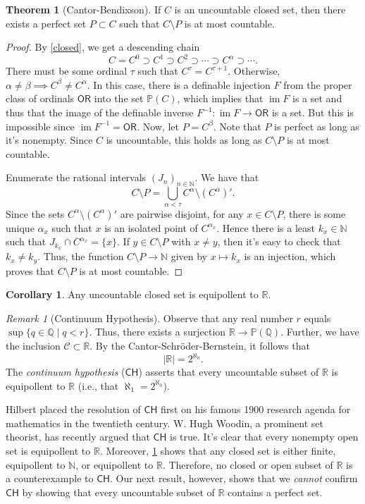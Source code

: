 \documentclass[10pt,letterpaper,cm]{nupset}
\theoremstyle{definition}
\theoremstyle{theorem}
\newtheorem{theorem}[definition]{Theorem}
\newtheorem{corollary}[definition]{Corollary}
\theoremstyle{remark}
\newtheorem{remark}[definition]{Remark}
\newcommand{\N}{\mathbb N}
\renewcommand{\P}{\mathbb P}
\newcommand{\Q}{\mathbb Q}
\newcommand{\R}{\mathbb R}
\newcommand{\1}{\mathbf{1}}
\newcommand{\0}{\vec 0}
\newcommand{\ord}{\mathsf{OR}}
\DeclareMathOperator{\im}{im}
\begin{document}
\begin{theorem}[Cantor-Bendixson]
If $C$ is an uncountable closed set, then there exists a perfect set $P\subset C$ such that $C \setminus P$ is at most countable.
\end{theorem}
\begin{proof}
By \cref{closed}, we get a descending chain $$ C = C^0 \supset C^1 \supset C^2 \supset \cdots \supset C^{\alpha} \supset \cdots.    $$ There must be some ordinal $\tau$ such that $C^{\tau} = C^{\tau +1}$. Otherwise, $\alpha \ne \beta \implies C^{\beta} \ne C^{\alpha}$. In this case, there is a definable injection $F$ from the proper class of ordinals $\ord$ into the set $\P(C)$, which implies that $\im{F}$ is a set and thus that the image of the definable inverse $F^{-1} : \im{F} \to \ord$ is a set. But this is impossible since $\im{F^{-1}} = \ord$. Now, let $P = C^{\beta}$. Note that $P$ is perfect as long as it's nonempty. Since $C$ is uncountable, this holds as long as  $C \setminus P$ is at most countable.

\smallskip
 Enumerate the rational intervals $\left(J_n\right)_{n\in \N}$. We have that $$ C\setminus P = {\bigcup_{\alpha < \tau} C^{\alpha} \setminus \left(C^{\alpha}\right)'}.    $$ Since the sets $C^{\alpha} \setminus \left(C^{\alpha}\right)'$ are pairwise disjoint, for any $x\in C\setminus P$, there is some unique $\alpha_x$ such that $x$ is an isolated point of $C^{\alpha_x}$. Hence there is a least $k_x \in \N$ such that $J_{k_x} \cap C^{\alpha_x} = \{x\}$. If $y \in C \setminus P$ with $x\ne y$, then it's easy to check that $k_x \ne k_y$. Thus, the function $C\setminus P \to \N$ given by $x \mapsto k_x$ is an injection, which proves that $C\setminus P$ is at most countable. 
\end{proof}

\begin{corollary}\label{LC'}
Any uncountable closed set is equipollent to $\R$.
\end{corollary}

\begin{remark}[Continuum Hypothesis] 
Observe that any real number $r$ equals $\sup\{q\in \Q \mid q<r\}$. Thus, there exists a surjection $\R \to \P(\Q)$. Further, we have the inclusion $\bm{\mathcal{C}} \subset \R$. By the Cantor-Schr\"oder-Bernstein, it follows that $$\left\lvert{\R}\right\rvert =2^{\aleph_0}.$$ The \textit{continuum hypothesis} ($\mathsf{CH}$) asserts that every uncountable subset of $\R$ is equipollent to $\R$ (i.e., that   $\aleph_1 =2^{\aleph_0}$).

Hilbert placed the resolution of $\mathsf{CH}$ first on his famous 1900 research agenda for mathematics in the twentieth century. W. Hugh Woodin, a prominent set theorist, has recently argued that $\mathsf{CH}$ is true. It's clear that every nonempty open set is equipollent to $\R$. Moreover, \cref{LC'} shows that any closed set is either finite, equipollent to $\N$, or equipollent to $\R$. Therefore, no closed or open subset of $\R$ is a counterexample to $\mathsf{CH}$. Our next result, however, shows that we \emph{cannot} confirm $\mathsf{CH}$ by showing that every uncountable subset of $\R$ contains a perfect set.
\end{remark}
\end{document}
